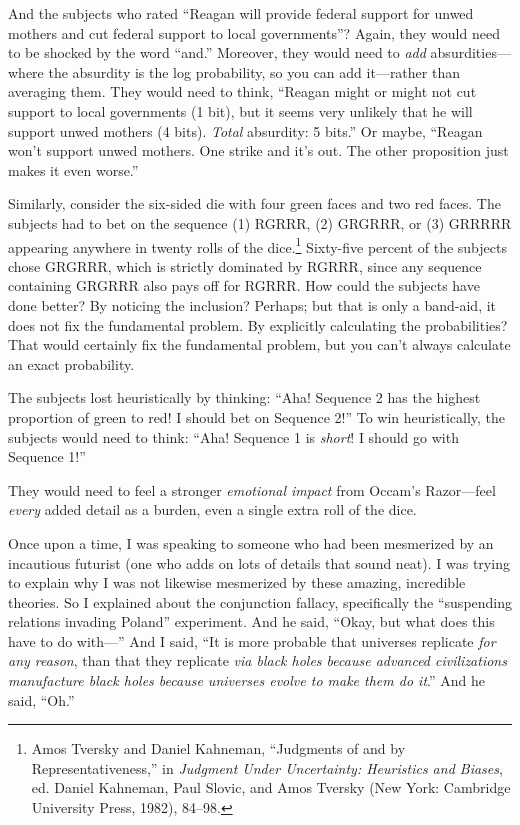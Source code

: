 {
 And the subjects who rated ``Reagan will provide
federal support for unwed mothers and cut federal support to local
governments''? Again, they would need to be shocked
by the word ``and.'' Moreover, they
would need to \textit{add} absurdities---where the absurdity is the log
probability, so you can add it---rather than averaging them. They would
need to think, ``Reagan might or might not cut support
to local governments (1 bit), but it seems very unlikely that he will
support unwed mothers (4 bits). \textit{Total} absurdity: 5
bits.'' Or maybe, ``Reagan
won't support unwed mothers. One strike and
it's out. The other proposition just makes it even
worse.''}

{
 Similarly, consider the six-sided die with four green faces and
two red faces. The subjects had to bet on the sequence (1) RGRRR, (2)
GRGRRR, or (3) GRRRRR appearing anywhere in twenty rolls of the
dice.\footnote{Amos Tversky and Daniel Kahneman, ``Judgments
of and by Representativeness,'' in \textit{Judgment
Under Uncertainty: Heuristics and Biases}, ed. Daniel Kahneman, Paul
Slovic, and Amos Tversky (New York: Cambridge University Press, 1982),
84--98.} Sixty-five percent of the subjects chose
GRGRRR, which is strictly dominated by RGRRR, since any sequence
containing GRGRRR also pays off for RGRRR. How could the subjects have
done better? By noticing the inclusion? Perhaps; but that is only a
band-aid, it does not fix the fundamental problem. By explicitly
calculating the probabilities? That would certainly fix the fundamental
problem, but you can't always calculate an exact
probability.}

{
 The subjects lost heuristically by thinking:
``Aha! Sequence 2 has the highest proportion of green
to red! I should bet on Sequence 2!'' To win
heuristically, the subjects would need to think:
``Aha! Sequence 1 is \textit{short}! I should go with
Sequence 1!''}

{
 They would need to feel a stronger \textit{emotional impact} from
Occam's Razor---feel \textit{every} added detail as a
burden, even a single extra roll of the dice.}

{
 Once upon a time, I was speaking to someone who had been
mesmerized by an incautious futurist (one who adds on lots of details
that sound neat). I was trying to explain why I was not likewise
mesmerized by these amazing, incredible theories. So I explained about
the conjunction fallacy, specifically the ``suspending
relations {\textpm} invading Poland'' experiment. And
he said, ``Okay, but what does this have to do
with---'' And I said, ``It is more
probable that universes replicate \textit{for any reason}, than that
they replicate \textit{via black holes because advanced civilizations
manufacture black holes because universes evolve to make them do
it}.'' And he said,
``Oh.''}

